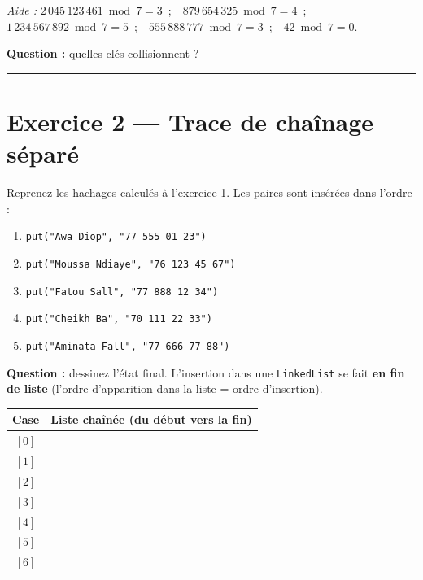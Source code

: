 \documentclass[11pt,a4paper]{article}
\begin{document}
\medskip

{\footnotesize\textit{Aide :} $2\,045\,123\,461 \bmod 7 = 3$\ ;\ \ $879\,654\,325 \bmod 7 = 4$\ ;\ \ $1\,234\,567\,892 \bmod 7 = 5$\ ;\ \ $555\,888\,777 \bmod 7 = 3$\ ;\ \ $42 \bmod 7 = 0$.}

\medskip

\textbf{Question :} quelles clés collisionnent ? \rule{8cm}{0.4pt}

\section{Exercice 2 --- Trace de chaînage séparé}

Reprenez les hachages calculés à l'exercice 1. Les paires sont insérées dans l'ordre :

\begin{enumerate}[leftmargin=1.5em,itemsep=0pt,topsep=0pt]
\item \texttt{put("Awa Diop", "77 555 01 23")}
\item \texttt{put("Moussa Ndiaye", "76 123 45 67")}
\item \texttt{put("Fatou Sall", "77 888 12 34")}
\item \texttt{put("Cheikh Ba", "70 111 22 33")}
\item \texttt{put("Aminata Fall", "77 666 77 88")}
\end{enumerate}

\medskip

\textbf{Question :} dessinez l'état final. L'insertion dans une \texttt{LinkedList} se fait \textbf{en fin de liste} (l'ordre d'apparition dans la liste = ordre d'insertion).

\medskip

\begin{center}
\renewcommand{\arraystretch}{1.9}
\begin{tabular}{|c|p{11cm}|}
\hline
\textbf{Case} & \textbf{Liste chaînée (du début vers la fin)} \\
\hline
$[0]$ & \\
\hline
$[1]$ & \\
\hline
$[2]$ & \\
\hline
$[3]$ & \\
\hline
$[4]$ & \\
\hline
$[5]$ & \\
\hline
$[6]$ & \\
\hline
\end{tabular}
\end{center}
\end{document}
